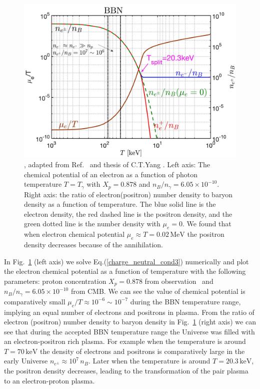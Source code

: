 \begin{figure}[ht]
\begin{center}
\includegraphics[width=\linewidth]{./plots/May152023_EPDensity_Chemical}
\caption{, adapted from Ref.~\cite{Grayson:2023flr} and thesis of C.T.Yang \cite{Yang:2024ret}. Left axis: The chemical potential of an electron as a function of photon temperature $T=T_\gamma$ with $X_p=0.878$ and $n_B/n_\gamma=6.05\times10^{-10}$. Right axis: the ratio of electron(positron) number density to baryon density as a function of temperature. The blue solid line is the electron density, the red dashed line is the positron density, and the green dotted line is the number density with $\mu_e=0$. We found that when electron chemical potential $\mu_e\approx T=0.02\,\mathrm{MeV}$ the positron density decreases because of the annihilation.}
\label{BBN_Electron}
\end{center}
\end{figure}

In Fig.~\ref{BBN_Electron} (left axis) we solve Eq.(\ref{charge_neutral_cond3}) numerically and plot the electron chemical potential as a function of temperature with the following parameters: proton concentration $X_p=0.878$ from 
 observation~\cite{ParticleDataGroup:2022pth} and  $n_B/n_\gamma=6.05\times10^{-10}$ from CMB. We can see the value of chemical potential is comparatively small $\mu_e/T\approx10^{-6}\sim10^{-7}$ during the BBN temperature range, implying an equal number of electrons and positrons in plasma. From the ratio of electron (positron) number density to baryon density in Fig.~\ref{BBN_Electron} (right axis) we can see that during the accepted BBN temperature range the Universe was filled with an electron-positron rich plasma.
For example when the temperature is around $T=70\,\mathrm{keV}$ the density of electrons and positrons is comparatively large in the early Universe $n_{e^\pm}\approx10^7\,n_B$. Later when the temperature is around $T=20.3\,\mathrm{keV}$, the positron density decreases, leading to the transformation of the pair plasma to an electron-proton plasma.
